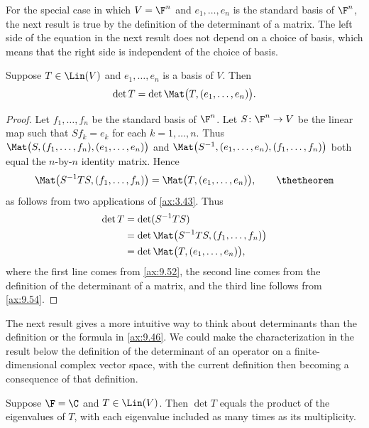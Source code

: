 For the special case in which $V=\F^n$ and $e_1,\dots,e_n$ is the standard
basis of $\F^n$, the next result is true by the definition of the determinant
of a matrix. The left side of the equation in the next result does not depend
on a choice of basis, which means that the right side is independent of the
choice of basis.

\begin{result}\label{ax:9.53}
Suppose $T\in\Lin(V)$ and $e_1,\dots,e_n$ is a basis of $V$. Then
\[ \det T = \det\Mat\bigl(T,(e_1,\dots,e_n)\bigr). \]
\end{result}

\begin{proof}
Let $f_1,\dots,f_n$ be the standard basis of $\F^n$. Let $S\colon\F^n\to V$ be
the linear map such that $Sf_k=e_k$ for each $k=1,\dots,n$. Thus
$\Mat\bigl(S,(f_1,\dots,f_n),(e_1,\dots,e_n)\bigr)$ and
$\Mat\bigl(S^{-1},(e_1,\dots,e_n),(f_1,\dots,f_n)\bigr)$ both equal the
$n$-by-$n$ identity matrix. Hence
%
\[ \Mat\bigl(S^{-1}TS,(f_1,\dots,f_n)\bigr) = \Mat\bigl(T,(e_1,\dots,e_n)\bigr),
   \tag*{\thetheorem}\label{ax:9.54} \]
as follows from two applications of \ref{ax:3.43}. Thus
\begin{align*}
\det T &= \det(S^{-1}TS)\\
       &= \det\Mat\bigl(S^{-1}TS,(f_1,\dots,f_n)\bigr)\\
       &= \det\Mat\bigl(T,(e_1,\dots,e_n)\bigr),
\end{align*}
where the first line comes from \ref{ax:9.52}, the second line comes from the
definition of the determinant of a matrix, and the third line follows from
\ref{ax:9.54}.
\end{proof}

The next result gives a more intuitive way to think about determinants than the
definition or the formula in \ref{ax:9.46}. We could make the characterization
in the result below the definition of the determinant of an operator on a
finite-dimensional complex vector space, with the current definition then
becoming a consequence of that definition.

\begin{result}[If $\F=\C$, then determinant equals product of eigenvalues]\label{ax:9.55}
Suppose $\F=\C$ and $T\in\Lin(V)$. Then $\det T$ equals the product of the
eigenvalues of $T$, with each eigenvalue included as many times as its
multiplicity.
\end{result}

